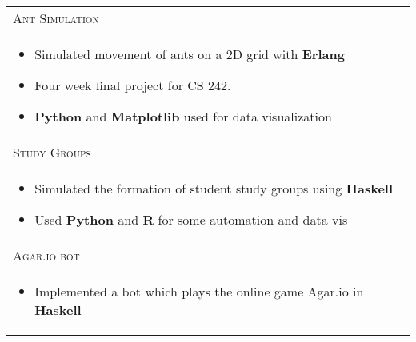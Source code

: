 \documentclass[letterpaper,10pt]{article}
\begin{document}
\begin{tabular}{p{15.8cm}}
    \textsc{Ant Simulation} \\

    \vspace{-2mm}
    \begin{itemize}
        \item Simulated movement of ants on a 2D grid with \textbf{Erlang}
        \item Four week final project for CS 242.
        \item \textbf{Python} and \textbf{Matplotlib} used for data visualization
    \end{itemize} \\

    \textsc{Study Groups} \\
    \vspace{-2mm}
    \begin{itemize}
        \item Simulated the formation of student study groups using \textbf{Haskell}
        \item Used \textbf{Python} and \textbf{R} for some automation and data vis
    \end{itemize} \\


    \textsc{Agar.io bot} \\
    \vspace{-2mm}
    \begin{itemize}
        \item Implemented a bot which plays the online game Agar.io in \textbf{Haskell}
    \end{itemize} \\



\end{tabular}
\end{document}
